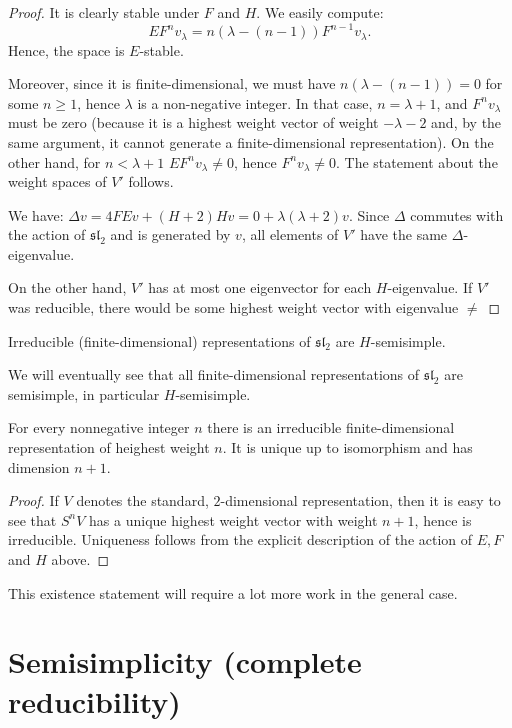 \begin{proof}
 It is clearly stable under $F$ and $H$. We easily compute:
$$ EF^nv_\lambda = n(\lambda-(n-1))F^{n-1}v_\lambda.$$
Hence, the space is $E$-stable. 

Moreover, since it is finite-dimensional, we must have $n(\lambda-(n-1))=0$ for some $n\ge 1$, hence $\lambda$ is a non-negative integer. In that case, $n=\lambda+1$, and $F^n v_\lambda$ must be zero (because it is a highest weight vector of weight $-\lambda-2$ and, by the same argument, it cannot generate a finite-dimensional representation). On the other hand, for $n<\lambda+1$ $EF^nv_\lambda\ne 0$, hence $F^nv_\lambda\ne 0$. The statement about the weight spaces of $V'$ follows.

We have: $\Delta v = 4FEv+(H+2)Hv = 0+ \lambda(\lambda+2)v$. Since $\Delta$ commutes with the action of $\mathfrak{sl}_2$ and is generated by $v$, all elements of $V'$ have the same $\Delta$-eigenvalue.

On the other hand, $V'$ has at most one eigenvector for each $H$-eigenvalue. If $V'$ was reducible, there would be some highest weight vector with eigenvalue $\ne $
\end{proof}

\begin{proposition}
 Irreducible (finite-dimensional) representations of $\mathfrak{sl}_2$ are $H$-semisimple. 
\end{proposition}

We will eventually see that all finite-dimensional representations of $\mathfrak{sl}_2$ are semisimple, in particular $H$-semisimple.

\begin{lemma}
 For every nonnegative integer $n$ there is an irreducible finite-dimensional representation of heighest weight $n$. It is unique up to isomorphism and has dimension $n+1$.
\end{lemma}

\begin{proof}
 If $V$ denotes the standard, $2$-dimensional representation, then it is easy to see that $S^n V$ has a unique highest weight vector with weight $n+1$, hence is irreducible. Uniqueness follows from the explicit description of the action of $E, F$ and $H$ above.
\end{proof}

This existence statement will require a lot more work in the general case.


\section{Semisimplicity (complete reducibility)}

